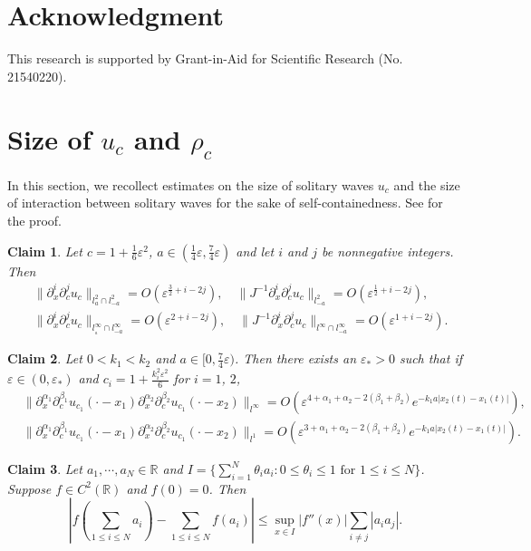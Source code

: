 \documentclass[11pt]{amsart}
\newtheorem{claim}{Claim}[section]
\theoremstyle{remark}
\numberwithin{equation}{section}
\begin{document}
\section*{Acknowledgment}
This research is supported by Grant-in-Aid for Scientific
Research (No. 21540220).

\appendix
\section{Size of $u_c$ and $\rho_c$}
\label{sec:size}
In this section, we recollect estimates on the size of solitary waves $u_c$
and the size of interaction between solitary waves for the sake of
self-containedness.
See \cite[Appendix A]{Mi2} for the proof.
\begin{claim}
  \label{cl:ucsize}
Let $c=1+\frac{1}{6}{\varepsilon}^2$, $a\in(\frac14{\varepsilon},\frac74{\varepsilon})$ and
let $i$ and $j$ be nonnegative integers. Then
\begin{align*}
& \|{\partial}_x^i{\partial}_c^ju_c\|_{l^2_a\cap l^2_{-a}}=O({\varepsilon}^{\frac32+i-2j}),
\quad \|J^{-1}{\partial}_x^i{\partial}_c^ju_c\|_{l^2_{-a}}=O({\varepsilon}^{\frac12+i-2j}),
\\ &
\|{\partial}_x^i{\partial}_c^ju_c\|_{l^\infty_{_a}\cap l^\infty_{-a}}=O({\varepsilon}^{2+i-2j}),
\quad \|J^{-1}{\partial}_x^i{\partial}_c^ju_c\|_{l^\infty\cap l^\infty_{-a}}=O({\varepsilon}^{1+i-2j}).
\end{align*}
\end{claim}
\begin{claim}
  \label{cl:intsize}
Let $0<k_1<k_2$ and $a\in[0,\frac74{\varepsilon})$.
Then there exists an ${\varepsilon}_*>0$ such
that if ${\varepsilon}\in(0,{\varepsilon}_*)$ and $c_i=1+\frac{k_i^2{\varepsilon}^2}6$ for $i=1$, $2$,
\begin{align*}
& \|{\partial}_x^{\alpha_1}{\partial}_c^{\beta_1}u_{c_1}(\cdot-x_1)
{\partial}_x^{\alpha_2}{\partial}_c^{\beta_2}u_{c_1}(\cdot-x_2)\|_{l^\infty}
=O({\varepsilon}^{4+\alpha_1+\alpha_2-2(\beta_1+\beta_2)}
e^{-k_1a|x_2(t)-x_1(t)|}),
\\ &
\|{\partial}_x^{\alpha_1}{\partial}_c^{\beta_1}u_{c_1}(\cdot-x_1)
{\partial}_x^{\alpha_2}{\partial}_c^{\beta_2}u_{c_1}(\cdot-x_2)\|_{l^1}
=O({\varepsilon}^{3+\alpha_1+\alpha_2-2(\beta_1+\beta_2)}e^{-k_1a|x_2(t)-x_1(t)|}).
\end{align*}
\end{claim}
 \begin{claim}
   \label{cl:4}
Let $a_1,\cdots,a_N\in{\mathbb{R}}$ and
$I=\{\sum_{i=1}^N\theta_ia_i:
 0\le \theta_i\le 1\text{ for $1\le i\le N$}\}$.
Suppose $f\in C^2({\mathbb{R}})$ and $f(0)=0$. Then
$$\left|f(\sum_{1\le i\le N}a_i)-\sum_{1\le i\le N}f(a_i)\right|
\le \sup_{x\in I}|f''(x)|\sum_{i\ne j}|a_ia_j|.$$
 \end{claim}
\end{document}
